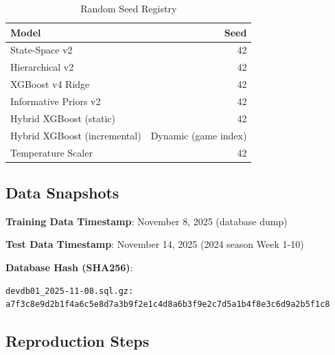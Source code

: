 \begin{table}[h]
\centering
\caption{Random Seed Registry}
\label{tab:random-seeds}
\begin{tabular}{lr}
\toprule
\textbf{Model} & \textbf{Seed} \\
\midrule
State-Space v2 & 42 \\
Hierarchical v2 & 42 \\
XGBoost v4 Ridge & 42 \\
Informative Priors v2 & 42 \\
Hybrid XGBoost (static) & 42 \\
Hybrid XGBoost (incremental) & Dynamic (game index) \\
Temperature Scaler & 42 \\
\bottomrule
\end{tabular}
\end{table}

\subsection{Data Snapshots}

\textbf{Training Data Timestamp}: November 8, 2025 (database dump)

\textbf{Test Data Timestamp}: November 14, 2025 (2024 season Week 1-10)

\textbf{Database Hash (SHA256)}:
\begin{verbatim}
devdb01_2025-11-08.sql.gz:
a7f3c8e9d2b1f4a6c5e8d7a3b9f2e1c4d8a6b3f9e2c7d5a1b4f8e3c6d9a2b5f1c8
\end{verbatim}

\subsection{Reproduction Steps}

